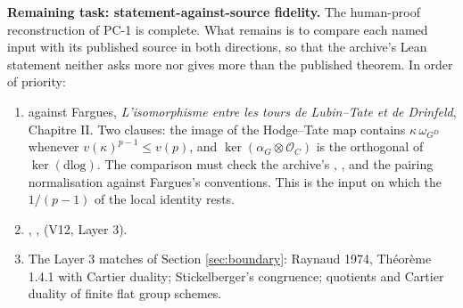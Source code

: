 \documentclass[11pt]{article}
\newcommand{\cO}{\mathcal O}
\theoremstyle{remark}
\begin{document}
\textbf{Remaining task: statement-against-source fidelity.}\label{sec:fidelity} The human-proof reconstruction of PC-1 is complete. What remains is to compare each named input with its published source in both directions, so that the archive's Lean statement neither asks more nor gives more than the published theorem. In order of priority:
\begin{enumerate}[nosep]
\item {} against Fargues, \emph{L'isomorphisme entre les tours de Lubin--Tate et de Drinfeld}, Chapitre II. Two clauses: the image of the Hodge--Tate map contains $\kappa\,\omega_{G^D}$ whenever $v(\kappa)^{p-1}\le v(p)$, and $\ker(\alpha_G\otimes\cO_C)$ is the orthogonal of $\ker(\mathrm{dlog})$. The comparison must check the archive's , ,  and the pairing normalisation  against Fargues's conventions. This is the input on which the $1/(p-1)$ of the local identity rests.
\item {}, ,  (V12, Layer 3).
\item The Layer 3 matches of Section \ref{sec:boundary}: Raynaud 1974, Th\'eor\`eme 1.4.1 with Cartier duality; Stickelberger's congruence; quotients and Cartier duality of finite flat group schemes.
\end{enumerate}
\end{document}

